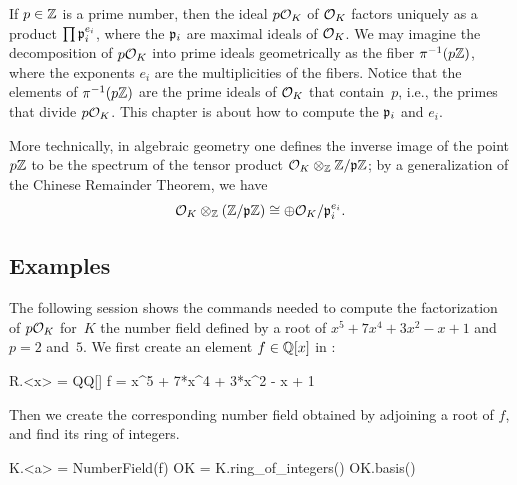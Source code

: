 If $p\in\mathbb{Z}$ is a prime number, then the ideal $p\mathcal{O}_K$ of $\mathcal{O}_K$
factors uniquely as a product $\prod \mathfrak{p}_i^{e_i}$, where the $\mathfrak{p}_i$ are
maximal ideals of $\mathcal{O}_K$.  We may imagine the decomposition of $p\mathcal{O}_K$
into prime ideals geometrically as the fiber $\pi^{-1}(p\mathbb{Z})$, where
the exponents $e_i$ are the multiplicities of the fibers.  Notice that
the elements of $\pi^{-1}(p\mathbb{Z})$ are the prime ideals of $\mathcal{O}_K$ that
contain~$p$, i.e., the primes that divide $p\mathcal{O}_K$.
This chapter is about how to compute the $\mathfrak{p}_i$ and $e_i$.





\begin{remark}
  More technically, in algebraic geometry one defines the inverse
  image of the point $p\mathbb{Z}$ to be the spectrum of the tensor product
  $\mathcal{O}_K \otimes_{\mathbb{Z}} \mathbb{Z}/\mathfrak{p}\mathbb{Z}$; by a generalization of the Chinese
  Remainder Theorem, we have
$$
  \mathcal{O}_K \otimes_{\mathbb{Z}} \left(\mathbb{Z}/\mathfrak{p}\mathbb{Z}\right) \cong \oplus \mathcal{O}_K/\mathfrak{p}_i^{e_i}.
$$
\end{remark}



\subsection{Examples}
The following \sage session shows the commands needed to compute
the factorization of $p\mathcal{O}_K$ for~$K$ the number field
defined by a root of $x^5+7x^4+3x^2-x+1$ and $p=2$ and~$5$.
We first create an element $f\in \mathbb{Q}[x]$ in \sage:
\begin{sagecode}
\begin{sagecell}
R.<x> = QQ[]
f = x^5 + 7*x^4 + 3*x^2 - x + 1
\end{sagecell}
\end{sagecode} %

\par\noindent{}Then we create the corresponding number field obtained
by adjoining a root of $f$, and find its ring of integers.
\begin{sagecode}
\begin{sagecell}
K.<a> = NumberField(f)
OK = K.ring_of_integers()
OK.basis()
\end{sagecell}
\begin{sageout}
[1, a, a^2, a^3, a^4]
\end{sageout}
\end{sagecode} %

